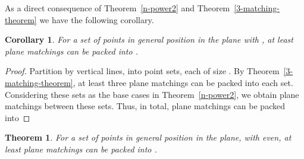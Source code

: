 \documentclass[11pt,a4paper]{article}
\newtheorem{corollary}{Corollary}
\newtheorem{theorem}{Theorem}
\begin{document}
As a direct consequence of Theorem~\ref{n-power2} and Theorem~\ref{3-matching-theorem} we have the following corollary.
\begin{corollary}
For a set  of  points in general position in the plane with , at least  plane matchings can be packed into .
\end{corollary}
\begin{proof}
 Partition  by vertical lines, into  point sets, each of size . By Theorem~\ref{3-matching-theorem}, at least three plane matchings can be packed into each set. Considering these sets as the base cases in Theorem~\ref{n-power2}, we obtain  plane matchings between these sets. Thus, in total,  plane matchings can be packed into 
\end{proof}


\begin{theorem}
For a set  of  points in general position in the plane, with  even, at least  plane matchings can be packed into .
\end{theorem}
\end{document}
